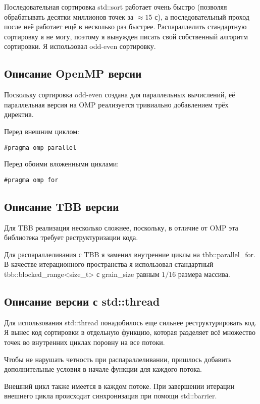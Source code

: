 \documentclass[a4paper]{article}
\begin{document}
Последовательная сортировка std::sort работает очень быстро (позволяя обрабатывать десятки миллионов точек за $\approx 15$ с), 
а последовательный проход после неё работает ещё в несколько раз быстрее. 
Распараллелить стандартную сортировку я не могу, поэтому я вынужден писать свой собственный алгоритм сортировки. 
Я использовал odd-even сортировку.

\subsection{Описание OpenMP версии}

Поскольку сортировка odd-even создана для параллельных вычислений, 
её параллельная версия на OMP реализуется тривиально добавлением 
трёх директив.

Перед внешним циклом:
\begin{lstlisting}
#pragma omp parallel
\end{lstlisting}

Перед обоими вложенными циклами:

\begin{lstlisting}
#pragma omp for
\end{lstlisting}

\subsection{Описание TBB версии}

Для TBB реализация несколько сложнее, поскольку, в отличие от OMP эта библиотека
требует реструктуризации кода. 

Для распараллеливания с TBB я заменил внутренние циклы на tbb::parallel\_for.
В качестве итерационного пространства я использовал стандартный tbb::blocked\_range<size\_t> с 
grain\_size равным $1/16$ размера массива.

\subsection{Описание версии с std::thread}
Для использования std::thread понадобилось еще сильнее реструктурировать код. 
Я вынес код сортировки в отдельную функцию, которая разделяет всё множество точек во внутренних циклах поровну на все потоки.

Чтобы не нарушать четность при распараллеливании, пришлось добавить дополнительные условия в начале 
функции для каждого потока. 

Внешний цикл также имеется в каждом потоке. При завершении итерации внешнего цикла происходит синхронизация
при помощи std::barrier.
\end{document}
